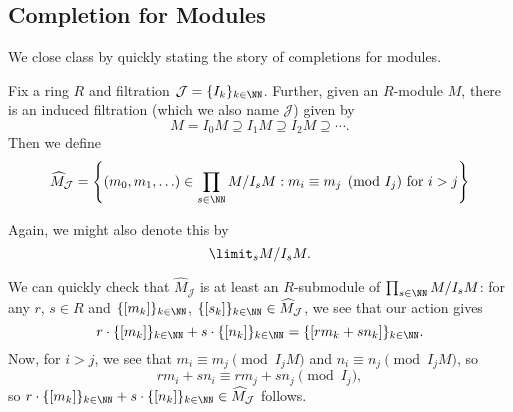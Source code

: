 \subsection{Completion for Modules}
We close class by quickly stating the story of completions for modules.
\begin{definition}
	Fix a ring $R$ and filtration $\mathcal J=\{I_k\}_{k\in\NN}$. Further, given an $R$-module $M$, there is an induced filtration (which we also name $\mathcal J$) given by
	\[M=I_0M\supseteq I_1M\supseteq I_2M\supseteq\cdots.\]
	Then we define
	\[\widehat M_\mathcal J=\left\{(m_0,m_1,\ldots)\in\prod_{s\in\NN}M/I_sM:m_i\equiv m_j\pmod{I_j}\text{ for }i>j\right\}\]
\end{definition}
\begin{remark}[Nir]
	Again, we might also denote this by
	\[\limit_sM/I_sM.\]
\end{remark}
We can quickly check that $\widehat M_\mathcal J$ is at least an $R$-submodule of $\prod_{s\in\NN}M/I_sM$: for any $r$, $s\in R$ and $\{[m_k]\}_{k\in\NN}$, $\{[s_k]\}_{k\in\NN}\in\widehat M_\mathcal J$, we see that our action gives
\[r\cdot\{[m_k]\}_{k\in\NN}+s\cdot\{[n_k]\}_{k\in\NN}=\{[rm_k+sn_k]\}_{k\in\NN}.\]
Now, for $i>j$, we see that $m_i\equiv m_j\pmod{I_jM}$ and $n_i\equiv n_j\pmod{I_jM}$, so
\[rm_i+sn_i\equiv rm_j+sn_j\pmod{I_j},\]
so $r\cdot\{[m_k]\}_{k\in\NN}+s\cdot\{[n_k]\}_{k\in\NN}\in\widehat M_\mathcal J$ follows.

